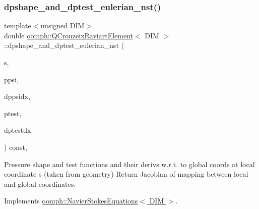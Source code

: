 \subsubsection{\texorpdfstring{dpshape\+\_\+and\+\_\+dptest\+\_\+eulerian\+\_\+nst()}{dpshape\_and\_dptest\_eulerian\_nst()}\hspace{0.1cm}{\footnotesize\ttfamily [1/3]}}
{\footnotesize\ttfamily template$<$unsigned D\+IM$>$ \\
double \hyperlink{classoomph_1_1QCrouzeixRaviartElement}{oomph\+::\+Q\+Crouzeix\+Raviart\+Element}$<$ D\+IM $>$\+::dpshape\+\_\+and\+\_\+dptest\+\_\+eulerian\+\_\+nst (\begin{DoxyParamCaption}\item[{const \hyperlink{classoomph_1_1Vector}{Vector}$<$ double $>$ \&}]{s,  }\item[{\hyperlink{classoomph_1_1Shape}{Shape} \&}]{ppsi,  }\item[{\hyperlink{classoomph_1_1DShape}{D\+Shape} \&}]{dppsidx,  }\item[{\hyperlink{classoomph_1_1Shape}{Shape} \&}]{ptest,  }\item[{\hyperlink{classoomph_1_1DShape}{D\+Shape} \&}]{dptestdx }\end{DoxyParamCaption}) const\hspace{0.3cm}{\ttfamily [inline]}, {\ttfamily [virtual]}}



Pressure shape and test functions and their derivs w.\+r.\+t. to global coords at local coordinate s (taken from geometry) Return Jacobian of mapping between local and global coordinates. 



Implements \hyperlink{classoomph_1_1NavierStokesEquations_a2f3024a4d370ec45ddffacb236bc2bb2}{oomph\+::\+Navier\+Stokes\+Equations$<$ D\+I\+M $>$}.

\mbox{\label{classoomph_1_1QCrouzeixRaviartElement_a16287c3b06313a8b44f17e82f1d4020d}} 
